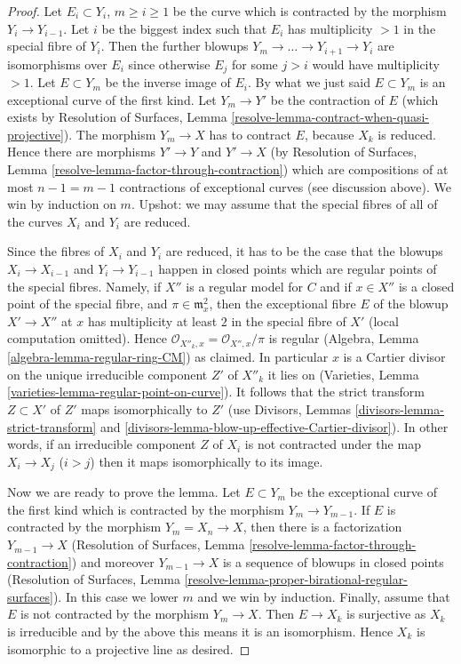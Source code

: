 \begin{proof}
\medskip\noindent
Let $E_i \subset Y_i$, $m \geq i \geq 1$ be the curve which is contracted
by the morphism $Y_i \to Y_{i - 1}$. Let $i$ be the biggest index such
that $E_i$ has multiplicity $> 1$ in the special fibre of $Y_i$.
Then the further blowups $Y_m \to \ldots \to Y_{i + 1} \to Y_i$
are isomorphisms over $E_i$ since otherwise $E_j$ for some $j > i$
would have multiplicity $> 1$. Let $E \subset Y_m$ be the inverse
image of $E_i$. By what we just said $E \subset Y_m$ is an
exceptional curve of the first kind. Let $Y_m \to Y'$ be the
contraction of $E$ (which exists by Resolution of Surfaces, Lemma
\ref{resolve-lemma-contract-when-quasi-projective}). The morphism
$Y_m \to X$ has to contract $E$, because $X_k$ is reduced.
Hence there are morphisms $Y' \to Y$ and $Y' \to X$ (by
Resolution of Surfaces, Lemma
\ref{resolve-lemma-factor-through-contraction})
which are compositions of at most $n - 1 = m - 1$ contractions
of exceptional curves (see discussion above). We win by induction on $m$.
Upshot: we may assume that the special fibres of all of
the curves $X_i$ and $Y_i$ are reduced.

\medskip\noindent
Since the fibres of $X_i$ and $Y_i$ are reduced, it has to be the
case that the blowups $X_i \to X_{i - 1}$ and $Y_i \to Y_{i - 1}$
happen in closed points which are regular points of the special fibres.
Namely, if $X''$ is a regular model for $C$ and if $x \in X''$
is a closed point of the special fibre, and
$\pi \in \mathfrak m_x^2$, then the exceptional fibre $E$ of the
blowup $X' \to X''$ at $x$ has multiplicity at least $2$ in the
special fibre of $X'$ (local computation omitted).
Hence $\mathcal{O}_{X''_k, x} = \mathcal{O}_{X'', x}/\pi$ is
regular (Algebra, Lemma \ref{algebra-lemma-regular-ring-CM}) as claimed.
In particular $x$ is a Cartier divisor on the unique
irreducible component $Z'$ of $X''_k$ it lies on
(Varieties, Lemma \ref{varieties-lemma-regular-point-on-curve}).
It follows that the strict transform $Z \subset X'$ of $Z'$
maps isomorphically to $Z'$
(use Divisors, Lemmas \ref{divisors-lemma-strict-transform} and
\ref{divisors-lemma-blow-up-effective-Cartier-divisor}).
In other words, if an irreducible component $Z$ of $X_i$
is not contracted under the map $X_i \to X_j$ ($i > j$)
then it maps isomorphically to its image.

\medskip\noindent
Now we are ready to prove the lemma.
Let $E \subset Y_m$ be the exceptional curve of the first kind
which is contracted by the morphism $Y_m \to Y_{m - 1}$. If $E$ is
contracted by the morphism $Y_m = X_n \to X$, then there is a factorization
$Y_{m - 1} \to X$ (Resolution of Surfaces, Lemma
\ref{resolve-lemma-factor-through-contraction})
and moreover $Y_{m - 1} \to X$ is a sequence of blowups
in closed points (Resolution of Surfaces, Lemma
\ref{resolve-lemma-proper-birational-regular-surfaces}).
In this case we lower $m$ and we win by induction.
Finally, assume that $E$ is not contracted by the morphism $Y_m \to X$.
Then $E \to X_k$ is surjective as $X_k$ is irreducible
and by the above this means it is an isomorphism.
Hence $X_k$ is isomorphic to a projective line as desired.
\end{proof}






